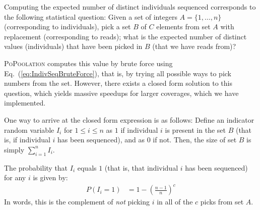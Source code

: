 \documentclass[a4paper,fontsize=9pt,DIV=14]{scrartcl}
\newcounter{popoolissue}
\newcommand\popoolissue[1]{}
\newcommand\toolname{\textsc}
\newcommand\eqnref[1]{Eq.~(\ref{#1})}
\newcommand{\coverage}{c}
\begin{document}
\popoolissue{We think that there is either an error here, or a bug in the code. The code in PoPoolation actually uses the minimum of coverage and pool size in the above, instead of the maximum as stated above, see \href{https://github.com/lczech/popoolation/blob/092e7a6f7ee4910c1bec4377e0adccc353175bc8/Modules/VarMath.pm\#L156}{here}. We are not sure which one is correct though, or what the implications of this are.}

\popoolissue{Furthermore, the original equations document states that ``$\tilde{n}$ is obtained averaging $\tilde{n}$ over the window W'', which we also stated above. However, looking at the code \href{https://github.com/lczech/popoolation/blob/092e7a6f7ee4910c1bec4377e0adccc353175bc8/Modules/VarMath.pm\#L127}{here}, there is no averaging over the window, and instead it's just computed once. The function for averaging exists in the same PoPoolation function as well, see \href{https://github.com/lczech/popoolation/blob/092e7a6f7ee4910c1bec4377e0adccc353175bc8/Modules/VarMath.pm\#L117-L125}{here}, but is commented out, and also contains a bug, as \texttt{\$cov} is not used. We are unsure how much averaging over the window vs just one value actually changes the results, and hence wanted to bring it up here.} 

Computing the expected number of distinct individuals sequenced corresponds to the following statistical question:
Given a set of integers $A = \{1, \ldots, n\}$ (corresponding to individuals),
pick a set $B$ of $C$ elements from set $A$ with replacement (corresponding to reads);
what is the expected number of distinct values (individuals) that have been picked in $B$ (that we have reads from)?

\toolname{PoPoolation} computes this value by brute force using \eqnref{eq:IndivSeqBruteForce},
that is, by trying all possible ways to pick numbers from the set.
However, there exists a closed form solution to this question, which yields massive speedups for larger coverages, which we have implemented.

One way to arrive at the closed form expression is as follows:
Define an indicator random variable $I_i$ for $1 \leq i \leq n$ as $1$
if individual $i$ is present in the set $B$ (that is, if individual $i$ has been sequenced), and as $0$ if not.
Then, the size of set $B$ is simply $\sum_{i=1}^{n} I_i$.

The probability that $I_i$ equals $1$ (that is, that individual $i$ has been sequenced)
for any $i$ is given by:
%
\begin{align}
    P(I_i = 1) &= 1-\left( \frac{n-1}{n} \right)^\coverage
\end{align}
%
In words, this is the complement of \emph{not} picking $i$ in all of the $\coverage$ picks from set $A$.
\end{document}
